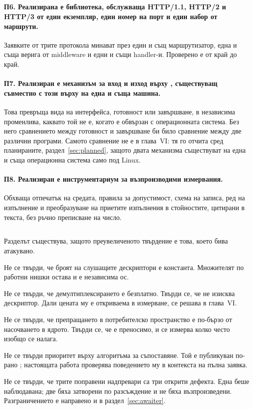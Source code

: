 \subsection*{}

\paragraph{П6. Реализирана е библиотека, обслужваща HTTP/1.1, HTTP/2 и HTTP/3 от един
екземпляр, един номер на порт и един набор от маршрути.}
Заявките от трите протокола минават през един и същ маршрутизатор, една и съща верига от
middleware и едни и същи handler-и. Проверено е от край до край.

\paragraph{П7. Реализиран е механизъм за вход и изход върху , съществуващ
съвместно с този върху  на една и съща машина.}
Това превръща вида на интерфейса, готовност или завършване, в независима променлива, каквато
той не е, когато е обвързан с операционната система. Без него сравнението между готовност и завършване
би било сравнение между две различни програми. Самото сравнение не е в глава~VI: тя го
отчита сред планираните, раздел~\ref{sec:planned}, защото двата механизма съществуват на една
и съща операционна система само под Linux.

\paragraph{П8. Реализиран е инструментариум за възпроизводими измервания.}
Обхваща отпечатък на средата, правила за допустимост, схема на записа, ред на изпълнение и
преобразуване на приетите изпълнения в стойностите, цитирани в текста, без ръчно преписване
на число.

\subsection*{}

Разделът съществува, защото преувеличеното твърдение е това, което бива атакувано.

Не се твърди, че броят на слушащите дескриптори е константа. Множителят по работни нишки
остава и е независима ос.

Не се твърди, че демултиплексирането е безплатно. Твърди се, че не изисква дескриптор.
Дали цената му е откриваема в измерване, се решава в глава~VI.

Не се твърди, че препращането в потребителско пространство е по-бързо от насочването в
ядрото. Твърди се, че е преносимо, и се измерва колко често изобщо се налага.

Не се твърди приоритет върху алгоритъма за съпоставяне. Той е публикуван по-рано
\cite{stankov2024regex}; настоящата работа проверява поведението му в контекста на пълна
заявка.

Не се твърди, че трите поправени надпревари са три открити дефекта. Една беше наблюдавана;
две бяха затворени по разсъждение и не бяха възпроизведени. Разграничението е направено и в
раздел~\ref{sec:awaiter}.
